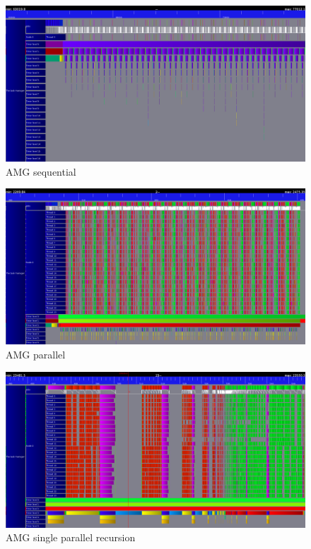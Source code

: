 \documentclass[a4paper,11pt]{scrartcl}
\begin{document}
\begin{figure}
    \includegraphics[width=1\textwidth]{seq.png}
    \caption{AMG sequential}\label{figure:sequ}
\end{figure}

\begin{figure}
    \includegraphics[width=1\textwidth]{iterations_trace.png}
    \caption{AMG parallel}\label{figure:par}
\end{figure}

\begin{figure}
    \includegraphics[width=1\textwidth]{undistributed_coloring_gs.png}
    \caption{AMG single parallel recursion}\label{figure:step}
\end{figure}
\end{document}
